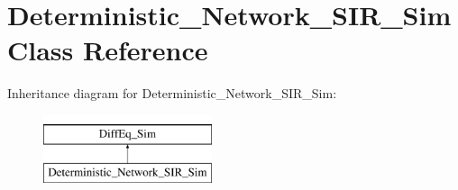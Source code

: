 \hypertarget{classDeterministic__Network__SIR__Sim}{}\section{Deterministic\+\_\+\+Network\+\_\+\+S\+I\+R\+\_\+\+Sim Class Reference}
\label{classDeterministic__Network__SIR__Sim}
Inheritance diagram for Deterministic\+\_\+\+Network\+\_\+\+S\+I\+R\+\_\+\+Sim\+:\begin{figure}[H]
\begin{center}
\leavevmode
\includegraphics[height=2.000000cm]{classDeterministic__Network__SIR__Sim}
\end{center}
\end{figure}
